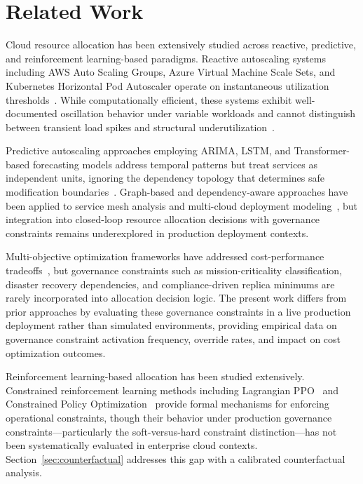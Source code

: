 \documentclass[runningheads]{llncs}
\begin{document}
\section{Related Work}
\label{sec:related}

Cloud resource allocation has been extensively studied across reactive, predictive, and reinforcement learning-based paradigms. Reactive autoscaling systems including AWS Auto Scaling Groups, Azure Virtual Machine Scale Sets, and Kubernetes Horizontal Pod Autoscaler operate on instantaneous utilization thresholds~\cite{wettinger}. While computationally efficient, these systems exhibit well-documented oscillation behavior under variable workloads and cannot distinguish between transient load spikes and structural underutilization~\cite{roy}.

Predictive autoscaling approaches employing ARIMA, LSTM, and Transformer-based forecasting models address temporal patterns but treat services as independent units, ignoring the dependency topology that determines safe modification boundaries~\cite{guo}. Graph-based and dependency-aware approaches have been applied to service mesh analysis and multi-cloud deployment modeling~\cite{wettinger}, but integration into closed-loop resource allocation decisions with governance constraints remains underexplored in production deployment contexts.

Multi-objective optimization frameworks have addressed cost-performance tradeoffs~\cite{nguyen}, but governance constraints such as mission-criticality classification, disaster recovery dependencies, and compliance-driven replica minimums are rarely incorporated into allocation decision logic. The present work differs from prior approaches by evaluating these governance constraints in a live production deployment rather than simulated environments, providing empirical data on governance constraint activation frequency, override rates, and impact on cost optimization outcomes.

Reinforcement learning-based allocation has been studied extensively. Constrained reinforcement learning methods including Lagrangian PPO~\cite{schulman} and Constrained Policy Optimization~\cite{achiam} provide formal mechanisms for enforcing operational constraints, though their behavior under production governance constraints---particularly the soft-versus-hard constraint distinction---has not been systematically evaluated in enterprise cloud contexts. Section~\ref{sec:counterfactual} addresses this gap with a calibrated counterfactual analysis.
\end{document}
